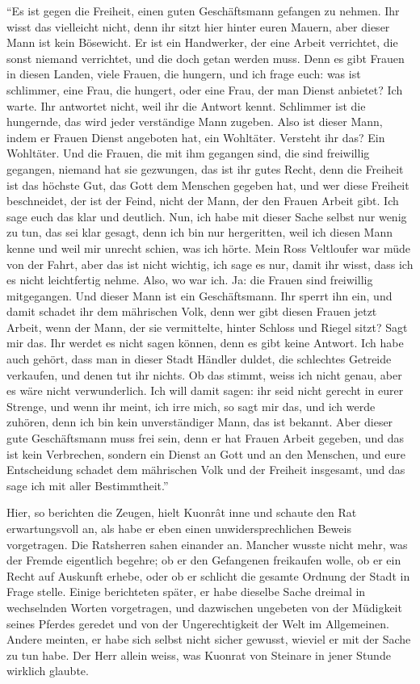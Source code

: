 \enquote{Es ist gegen die \gls{Freiheit}, einen guten Geschäftsmann gefangen zu nehmen. Ihr wisst das vielleicht nicht, denn ihr sitzt hier hinter euren Mauern, aber dieser Mann ist kein Bösewicht. Er ist ein Handwerker, der eine Arbeit verrichtet, die sonst niemand verrichtet, und die doch getan werden muss. Denn es gibt Frauen in diesen Landen, viele Frauen, die hungern, und ich frage euch: was ist schlimmer, eine Frau, die hungert, oder eine Frau, der man Dienst anbietet? Ich warte. Ihr antwortet nicht, weil ihr die Antwort kennt. Schlimmer ist die hungernde, das wird jeder verständige Mann zugeben. Also ist dieser Mann, indem er Frauen Dienst angeboten hat, ein Wohltäter. Versteht ihr das? Ein Wohltäter. Und die Frauen, die mit ihm gegangen sind, die sind freiwillig gegangen, niemand hat sie gezwungen, das ist ihr gutes Recht, denn die \gls{Freiheit} ist das höchste Gut, das Gott dem Menschen gegeben hat, und wer diese \gls{Freiheit} beschneidet, der ist der Feind, nicht der Mann, der den Frauen Arbeit gibt. Ich sage euch das klar und deutlich. Nun, ich habe mit dieser Sache selbst nur wenig zu tun, das sei klar gesagt, denn ich bin nur hergeritten, weil ich diesen Mann kenne und weil mir unrecht schien, was ich hörte. Mein Ross \gls{Veltloufer} war müde von der Fahrt, aber das ist nicht wichtig, ich sage es nur, damit ihr wisst, dass ich es nicht leichtfertig nehme. Also, wo war ich. Ja: die Frauen sind freiwillig mitgegangen. Und dieser Mann ist ein Geschäftsmann. Ihr sperrt ihn ein, und damit schadet ihr dem mährischen Volk, denn wer gibt diesen Frauen jetzt Arbeit, wenn der Mann, der sie vermittelte, hinter Schloss und Riegel sitzt? Sagt mir das. Ihr werdet es nicht sagen können, denn es gibt keine Antwort. Ich habe auch gehört, dass man in dieser Stadt Händler duldet, die schlechtes Getreide verkaufen, und denen tut ihr nichts. Ob das stimmt, weiss ich nicht genau, aber es wäre nicht verwunderlich. Ich will damit sagen: ihr seid nicht gerecht in eurer Strenge, und wenn ihr meint, ich irre mich, so sagt mir das, und ich werde zuhören, denn ich bin kein unverständiger Mann, das ist bekannt. Aber dieser gute Geschäftsmann muss frei sein, denn er hat Frauen Arbeit gegeben, und das ist kein Verbrechen, sondern ein Dienst an Gott und an den Menschen, und eure Entscheidung schadet dem mährischen Volk und der \gls{Freiheit} insgesamt, und das sage ich mit aller Bestimmtheit.}

Hier, so berichten die Zeugen, hielt Kuonr\^{a}t inne und schaute den Rat erwartungsvoll an, als habe er eben einen unwidersprechlichen Beweis vorgetragen. Die Ratsherren sahen einander an. Mancher wusste nicht mehr, was der Fremde eigentlich begehre; ob er den Gefangenen freikaufen wolle, ob er ein Recht auf Auskunft erhebe, oder ob er schlicht die gesamte Ordnung der Stadt in Frage stelle. Einige berichteten später, er habe dieselbe Sache dreimal in wechselnden Worten vorgetragen, und dazwischen ungebeten von der Müdigkeit seines Pferdes geredet und von der Ungerechtigkeit der Welt im Allgemeinen. Andere meinten, er habe sich selbst nicht sicher gewusst, wieviel er mit der Sache zu tun habe. Der Herr allein weiss, was \gls{Kuonrat von Steinare} in jener Stunde wirklich glaubte.

